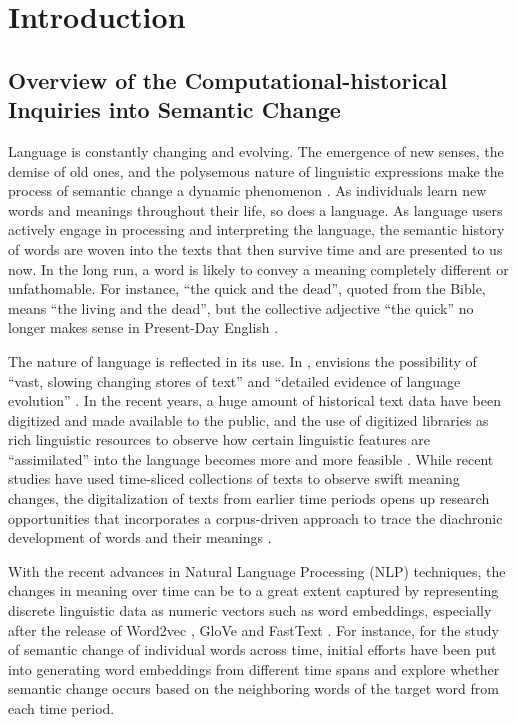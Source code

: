 

\chapter{Introduction}
\section{Overview of the Computational-historical Inquiries into Semantic Change}
Language is constantly changing and evolving. The emergence of new senses, the demise of old ones, and the polysemous nature of linguistic expressions make the process of semantic change a dynamic phenomenon \parencite{robertinvanhove2008}. As individuals learn new words and meanings throughout their life, so does a language. As language users actively engage in processing and interpreting the language, the semantic history of words are woven into the texts that then survive time and are presented to us now. In the long run, a word is likely to convey a meaning completely different or unfathomable. For instance, ``the quick and the dead'', quoted from the Bible, means ``the living and the dead'', but the collective adjective ``the quick'' no longer makes sense in Present-Day English \parencite[199]{semanticincrowley2010}.

The nature of language is reflected in its use. In \citeyear{sinclair1982reflections}, \citeauthor{sinclair1982reflections} envisions the possibility of ``vast, slowing changing stores of text'' and ``detailed evidence of language evolution'' . In the recent years, a huge amount of historical text data have been digitized and made available to the public, and the use of digitized libraries as rich linguistic resources to observe how certain linguistic features are ``assimilated'' into the language becomes more and more feasible \parencite{renouf2002time}. While recent studies have used time-sliced collections of texts to observe swift meaning changes, the digitalization of texts from earlier time periods opens up research opportunities that incorporates a corpus-driven approach to trace the diachronic development of words and their meanings \parencite{kutuzov2018survey,tahmasebi2018survey,camacho2018survey}.

With the recent advances in Natural Language Processing (NLP) techniques, the changes in meaning over time can be to a great extent captured by representing discrete linguistic data as numeric vectors such as word embeddings, especially after the release of Word2vec \parencite{mikolov2013efficient}, GloVe \parencite{pennington2014glove} and FastText \parencite{bojanowski2016enriching}. For instance, for the study of semantic change of individual words across time, initial efforts have been put into generating word embeddings from different time spans and explore whether semantic change occurs based on the neighboring words of the target word from each time period.


